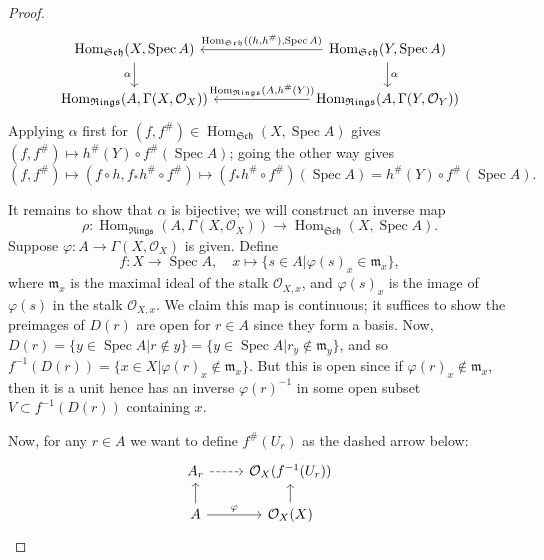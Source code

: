 \documentclass[12pt,letterpaper]{article}
\theoremstyle{definition}
\theoremstyle{remark}
\numberwithin{equation}{section}
\numberwithin{figure}{problem}
\DeclareMathOperator{\Spec}{Spec}
\DeclareMathOperator{\Hom}{Hom}
\newcommand{\OO}{\mathcal{O}}
\newcommand{\Sch}{\mathfrak{Sch}}
\newcommand{\Rings}{\mathfrak{Rings}}
\begin{document}
\begin{proof}
\begin{equation*}
    \begin{tikzcd}[column sep=16ex]
      \Hom_\Sch(X,\Spec A) \dar[swap]{\alpha} & \arrow{l}[swap]{\Hom_\Sch((h,h^\#),\Spec A)} \Hom_\Sch(Y,\Spec A)\dar{\alpha}\\
      \Hom_\Rings(A,\Gamma(X,\OO_X)) & \arrow{l}[swap]{\Hom_\Rings(A,h^\#(Y))} \Hom_\Rings(A,\Gamma(Y,\OO_Y))
    \end{tikzcd}
  \end{equation*}
  Applying $\alpha$ first for $(f,f^\#) \in \Hom_\Sch(X,\Spec A)$ gives $(f,f^\#) \mapsto h^\#(Y) \circ f^\#(\Spec A)$; going the other way gives
  \begin{equation*}
    (f,f^\#) \mapsto (f \circ h,f_*h^\# \circ f^\#) \mapsto (f_*h^\# \circ f^\#)(\Spec A) = h^\#(Y) \circ f^\#(\Spec A).
  \end{equation*}
  \par It remains to show that $\alpha$ is bijective; we will construct an inverse map
  \begin{equation*}
    \rho \colon \Hom_\Rings(A,\Gamma(X,\OO_X)) \to \Hom_\Sch(X,\Spec A). 
  \end{equation*}
  Suppose $\varphi\colon A \to \Gamma(X,\OO_X)$ is given. Define
  \begin{equation*}
    f\colon X \to \Spec A, \quad x \longmapsto \{s \in A \vert \varphi(s)_x \in \mathfrak{m}_x\},
  \end{equation*}
  where $\mathfrak{m}_x$ is the maximal ideal of the stalk $\OO_{X,x}$, and $\varphi(s)_x$ is the image of $\varphi(s)$ in the stalk $\OO_{X,x}$. We claim this map is continuous; it suffices to show the preimages of $D(r)$ are open for $r \in A$ since they form a basis. Now, $D(r) = \{y \in \Spec A \vert r \notin y\} = \{y \in \Spec A \vert r_y \notin \mathfrak{m}_y\}$, and so $f^{-1}(D(r)) = \{x \in X \vert \varphi(r)_x \notin \mathfrak{m}_x\}$. But this is open since if $\varphi(r)_x \notin \mathfrak{m}_x$, then it is a unit \cite[Cor.~1.5]{AM69} hence has an inverse $\varphi(r)^{-1}$ in some open subset $V \subset f^{-1}(D(r))$ containing $x$.
  \par Now, for any $r \in A$ we want to define $f^\#(U_r)$ as the dashed arrow below:
  \begin{equation}\label{eq4b}
    \begin{tikzcd}[row sep=scriptsize]
      A_r \rar[dashed] & \OO_X(f^{-1}(U_r))\\
      A \uar \rar{\varphi} & \OO_X(X) \uar
    \end{tikzcd}
  \end{equation}

\end{proof}
\end{document}
